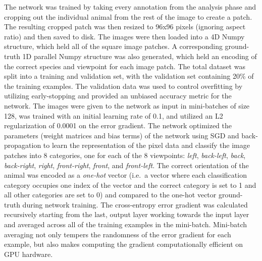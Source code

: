 The network was trained by taking every annotation from the analysis phase and cropping out the individual animal from the rest of the image to create a patch.  The resulting cropped patch was then resized to 96x96 pixels (ignoring aspect ratio) and then saved to disk.  The images were then loaded into a 4D Numpy \cite{van_der_walt_numpy_2011} structure, which held all of the square image patches.  A corresponding ground-truth 1D parallel Numpy structure was also generated, which held an encoding of the correct species and viewpoint for each image patch.  The total dataset was split into a training and validation set, with the validation set containing 20\% of the training examples.  The validation data was used to control overfitting by utilizing early-stopping and provided an unbiased accuracy metric for the network.  The images were given to the network as input in mini-batches of size 128, was trained with an initial learning rate of 0.1, and utilized an L2 regularization of 0.0001 on the error gradient.  The network optimized the parameters (weight matrices and bias terms) of the network using SGD and back-propagation \cite{rumelhart_learning_1986} to learn the representation of the pixel data and classify the image patches into 8 categories, one for each of the 8 viewpoints: \textit{left}, \textit{back-left}, \textit{back}, \textit{back-right}, \textit{right}, \textit{front-right}, \textit{front}, and \textit{front-left}.  The correct orientation of the animal was encoded as a \textit{one-hot} vector (i.e.\ a vector where each classification category occupies one index of the vector and the correct category is set to 1 and all other categories are set to 0) and compared to the one-hot vector ground-truth during network training.   The cross-entropy error gradient was calculated recursively starting from the last, output layer working towards the input layer and averaged across all of the training examples in the mini-batch.  Mini-batch averaging not only tempers the randomness of the error gradient for each example, but also makes computing the gradient computationally efficient on GPU hardware.

